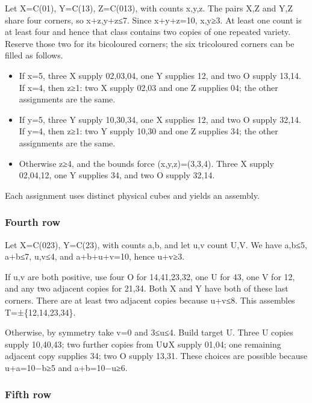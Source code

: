 \documentclass[
  10pt,
]{article}
\providecommand{\tightlist}{%
  \setlength{\itemsep}{0pt}\setlength{\parskip}{0pt}}
\begin{document}
Let X=C(01), Y=C(13), Z=C(013), with counts x,y,z. The pairs X,Z and Y,Z
share four corners, so x+z,y+z≤7. Since x+y+z=10, x,y≥3. At least one
count is at least four and hence that class contains two copies of one
repeated variety. Reserve those two for its bicoloured corners; the six
tricoloured corners can be filled as follows.

\begin{itemize}
\tightlist
\item
  If x=5, three X supply 02,03,04, one Y supplies 12, and two O supply
  13,14. If x=4, then z≥1: two X supply 02,03 and one Z supplies 04; the
  other assignments are the same.
\item
  If y=5, three Y supply 10,30,34, one X supplies 12, and two O supply
  32,14. If y=4, then z≥1: two Y supply 10,30 and one Z supplies 34; the
  other assignments are the same.
\item
  Otherwise z≥4, and the bounds force (x,y,z)=(3,3,4). Three X supply
  02,04,12, one Y supplies 34, and two O supply 32,14.
\end{itemize}

Each assignment uses distinct physical cubes and yields an assembly.

\hypertarget{fourth-row}{%
\subsubsection*{Fourth row}\label{fourth-row}}

Let X=C(023), Y=C(23), with counts a,b, and let u,v count U,V. We have
a,b≤5, a+b≤7, u,v≤4, and a+b+u+v=10, hence u+v≥3.

If u,v are both positive, use four O for 14,41,23,32, one U for 43, one
V for 12, and any two adjacent copies for 21,34. Both X and Y have both
of these last corners. There are at least two adjacent copies because
u+v≤8. This assembles T=±\{12,14,23,34\}.

Otherwise, by symmetry take v=0 and 3≤u≤4. Build target U. Three U
copies supply 10,40,43; two further copies from U∪X supply 01,04; one
remaining adjacent copy supplies 34; two O supply 13,31. These choices
are possible because u+a=10−b≥5 and a+b=10−u≥6.

\hypertarget{fifth-row}{%
\subsubsection*{Fifth row}\label{fifth-row}}
\end{document}

